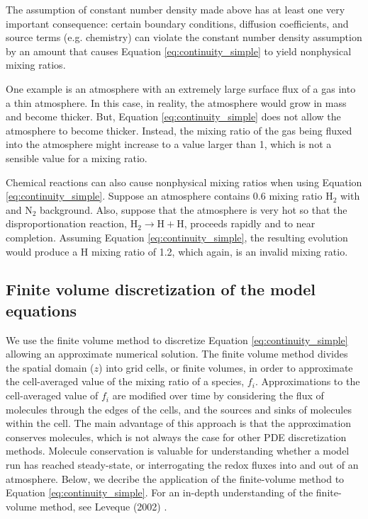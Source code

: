 \documentclass{article}
\begin{document}
The assumption of constant number density made above has at least one very important consequence: certain boundary conditions, diffusion coefficients, and source terms (e.g. chemistry) can violate the constant number density assumption by an amount that causes Equation \eqref{eq:continuity_simple} to yield nonphysical mixing ratios.

One example is an atmosphere with an extremely large surface flux of a gas into a thin atmosphere. In this case, in reality, the atmosphere would grow in mass and become thicker. But, Equation \eqref{eq:continuity_simple} does not allow the atmosphere to become thicker. Instead, the mixing ratio of the gas being fluxed into the atmosphere might increase to a value larger than 1, which is not a sensible value for a mixing ratio.

Chemical reactions can also cause nonphysical mixing ratios when using Equation \eqref{eq:continuity_simple}. Suppose an atmosphere contains 0.6 mixing ratio H$_2$ with and N$_2$ background. Also, suppose that the atmosphere is very hot so that the disproportionation reaction, $\mathrm{H_2} \rightarrow \mathrm{H} + \mathrm{H}$, proceeds rapidly and to near completion. Assuming Equation \eqref{eq:continuity_simple}, the resulting evolution would produce a H mixing ratio of 1.2, which again, is an invalid mixing ratio.

\subsection{Finite volume discretization of the model equations} \label{sec:finite_volume}

We use the finite volume method to discretize Equation \eqref{eq:continuity_simple} allowing an approximate numerical solution. The finite volume method divides the spatial domain ($z$) into grid cells, or finite volumes, in order to approximate the cell-averaged value of the mixing ratio of a species, $f_i$. Approximations to the cell-averaged value of $f_i$ are modified over time by considering the flux of molecules through the edges of the cells, and the sources and sinks of molecules within the cell. The main advantage of this approach is that the approximation conserves molecules, which is not always the case for other PDE discretization methods. Molecule conservation is valuable for understanding whether a model run has reached steady-state, or interrogating the redox fluxes into and out of an atmosphere. Below, we decribe the application of the finite-volume method to Equation \eqref{eq:continuity_simple}. For an in-depth understanding of the finite-volume method, see Leveque (2002) \cite{Leveque_2002}.
\end{document}
